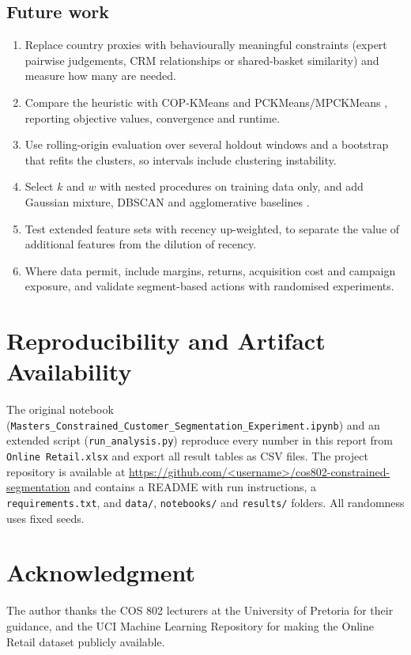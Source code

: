 \documentclass[conference,10pt]{IEEEtran}
\begin{document}
\subsection{Future work}
\begin{enumerate}
  \item Replace country proxies with behaviourally meaningful constraints
  (expert pairwise judgements, CRM relationships or shared-basket
  similarity) and measure how many are needed.
  \item Compare the heuristic with COP-KMeans \cite{wagstaff2001constrained}
  and PCKMeans/MPCKMeans \cite{basu2004probabilistic}, reporting objective
  values, convergence and runtime.
  \item Use rolling-origin evaluation over several holdout windows and a
  bootstrap that refits the clusters, so intervals include clustering
  instability.
  \item Select $k$ and $w$ with nested procedures on training data only, and
  add Gaussian mixture, DBSCAN and agglomerative baselines
  \cite{john2023exploration,wani2024comprehensive}.
  \item Test extended feature sets with recency up-weighted, to separate the
  value of additional features from the dilution of recency.
  \item Where data permit, include margins, returns, acquisition cost and
  campaign exposure, and validate segment-based actions with randomised
  experiments.
\end{enumerate}

\section*{Reproducibility and Artifact Availability}
The original notebook
(\texttt{Masters\_Constrained\_\allowbreak Customer\_\allowbreak Segmentation\_\allowbreak Experiment.ipynb})
and an extended script (\texttt{run\_analysis.py}) reproduce every number in
this report from \texttt{Online Retail.xlsx} and export all result tables as
CSV files. The project repository is available at
\url{https://github.com/<username>/cos802-constrained-segmentation}
and contains a README with run instructions, a \texttt{requirements.txt},
and \texttt{data/}, \texttt{notebooks/} and \texttt{results/} folders. All
randomness uses fixed seeds.

\section*{Acknowledgment}
The author thanks the COS 802 lecturers at the University of Pretoria for
their guidance, and the UCI Machine Learning Repository for making the Online
Retail dataset publicly available.
\end{document}
